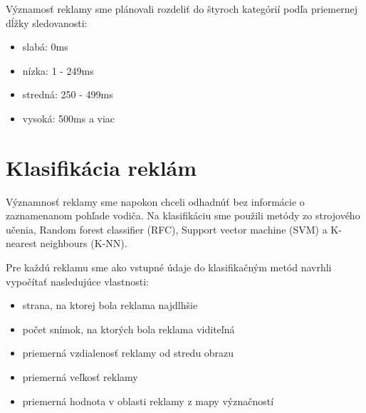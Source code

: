 
Významosť reklamy sme plánovali rozdeliť do štyroch kategórií podľa priemernej dĺžky sledovanosti: 

\begin{itemize}
  \item slabá: 0ms
  \item nízka: 1 - 249ms
  \item stredná: 250 - 499ms
  \item vysoká: 500ms a viac 
\end{itemize}


\section{Klasifikácia reklám}

Významnosť reklamy sme napokon chceli odhadnúť bez informácie o zaznamenanom pohľade vodiča. Na klasifikáciu sme použili metódy zo strojového učenia, Random forest classifier (RFC), Support vector machine (SVM) a K-nearest neighbours (K-NN). 


Pre každú reklamu sme ako vstupné údaje do klasifikačným metód navrhli vypočítať nasledujúce vlastnosti: %

\begin{itemize}
  \item strana, na ktorej bola reklama najdlhšie
  \item počet snímok, na ktorých bola reklama viditeľná
  \item priemerná vzdialenosť reklamy od stredu obrazu
  \item priemerná veľkosť reklamy
  \item priemerná hodnota v oblasti reklamy z mapy význačností %
\end{itemize}


